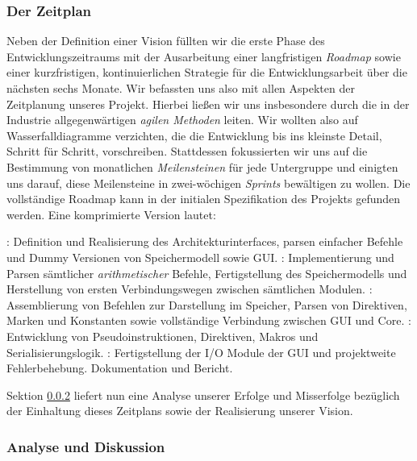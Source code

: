\subsubsection{Der Zeitplan}
\label{team:orga-plan-time}

Neben der Definition einer Vision füllten wir die erste Phase des
Entwicklungszeitraums mit der Ausarbeitung einer langfristigen \emph{Roadmap}
sowie einer kurzfristigen, kontinuierlichen Strategie für die Entwicklungsarbeit
über die nächsten sechs Monate. Wir befassten uns also mit allen Aspekten der
Zeitplanung unseres Projekt. Hierbei ließen wir uns insbesondere durch die in
der Industrie allgegenwärtigen \emph{agilen Methoden} leiten. Wir wollten also
auf Wasserfalldiagramme verzichten, die die Entwicklung bis ins kleinste Detail,
Schritt für Schritt, vorschreiben. Stattdessen fokussierten wir uns auf die
Bestimmung von monatlichen \emph{Meilensteinen} für jede Untergruppe und
einigten uns darauf, diese Meilensteine in zwei-wöchigen \emph{Sprints}
bewältigen zu wollen. Die vollständige Roadmap kann in der initialen
Spezifikation des Projekts gefunden werden. Eine komprimierte Version lautet:

\begin{itemize}
  : Definition und Realisierung des Architekturinterfaces, parsen einfacher Befehle und Dummy Versionen von Speichermodell sowie GUI.
  : Implementierung und Parsen sämtlicher \emph{arithmetischer} Befehle, Fertigstellung des Speichermodells und Herstellung von ersten Verbindungswegen zwischen sämtlichen Modulen.
  : Assemblierung von Befehlen zur Darstellung im Speicher, Parsen von Direktiven, Marken und Konstanten sowie vollständige Verbindung zwischen GUI und Core.
  : Entwicklung von Pseudoinstruktionen, Direktiven, Makros und Serialisierungslogik.
  : Fertigstellung der I/O Module der GUI und projektweite Fehlerbehebung.
   Dokumentation und Bericht.
\end{itemize}

Sektion \ref{team:orga-plan-anal} liefert nun eine Analyse unserer Erfolge und Misserfolge bezüglich der Einhaltung dieses Zeitplans sowie der Realisierung unserer Vision.

\subsubsection{Analyse und Diskussion}
\label{team:orga-plan-anal}

